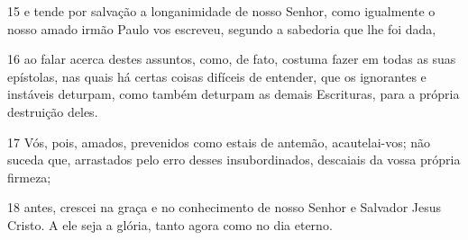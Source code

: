 \par 15 e tende por salvação a longanimidade de nosso Senhor, como igualmente o nosso amado irmão Paulo vos escreveu, segundo a sabedoria que lhe foi dada,
\par 16 ao falar acerca destes assuntos, como, de fato, costuma fazer em todas as suas epístolas, nas quais há certas coisas difíceis de entender, que os ignorantes e instáveis deturpam, como também deturpam as demais Escrituras, para a própria destruição deles.
\par 17 Vós, pois, amados, prevenidos como estais de antemão, acautelai-vos; não suceda que, arrastados pelo erro desses insubordinados, descaiais da vossa própria firmeza;
\par 18 antes, crescei na graça e no conhecimento de nosso Senhor e Salvador Jesus Cristo. A ele seja a glória, tanto agora como no dia eterno.


